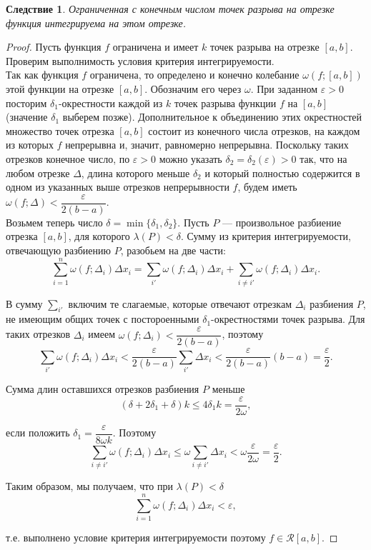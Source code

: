 \documentclass[12pt]{report}
\numberwithin{equation}{section}
\newtheorem{remark}{Следствие}[section]
\begin{document}
\begin{remark} Ограниченная с конечным числом точек разрыва на отрезке функция интегрируема на этом отрезке.
\end{remark}
\begin{proof}
Пусть функция $f$ ограничена и имеет $k$ точек разрыва на отрезке $[a,b]$. Проверим выполнимость условия критерия интегрируемости.\\

Так как функция $f$ ограничена, то определено и конечно колебание $\omega(f; [a,b])$ этой функции на отрезке $[a,b]$. Обозначим его через $\omega$. При заданном $\varepsilon > 0$ посторим $\delta_1$-окрестности каждой из $k$ точек разрыва функции $f$ на $[a,b]$ (значение $\delta_1$ выберем позже). Дополнительное к объединению этих окрестностей множество точек отрезка $[a,b]$ состоит из конечного числа отрезков, на каждом из которых $f$ непрерывна и, значит, равномерно непрерывна. Поскольку таких отрезков конечное число, по $\varepsilon > 0$ можно указать $\delta_2 = \delta_2(\varepsilon) > 0$ так, что на любом отрезке $\Delta$, длина которого меньше $\delta_2$  и который полностью содержится в одном из указанных выше отрезков непрерывности $f$, будем иметь $\omega(f; \Delta) < \dfrac{\varepsilon}{2(b-a)}$.\\

Возьмем теперь число $\delta = \min\{\delta_1, \delta_2\}$. Пусть $P$ --- произвольное разбиение отрезка $[a,b]$, для которого $\lambda(P) < \delta$. Сумму из критерия интегрируемости, отвечающую разбиению $P$, разобьем на две части:
\[ \sum_{i = 1}^n \omega(f; \Delta_i) \Delta x_i = \sum_{i'} \omega(f; \Delta_i) \Delta x_i + \sum_{i \neq i'} \omega(f; \Delta_i) \Delta x_i.\]

В сумму $\sum\limits_{i'}$ включим те слагаемые, которые отвечают отрезкам $\Delta_i$ разбиения $P$, не имеющим общих точек с постороенными $\delta_1$-окрестностями точек разрыва. Для таких отрезков $\Delta_i$ имеем $\omega(f; \Delta_i) < \dfrac{\varepsilon}{2(b-a)}$, поэтому
\[ \sum_{i'} \omega(f; \Delta_i) \Delta x_i < \frac{\varepsilon}{2(b-a)} \sum_{i'} \Delta x_i < \frac{\varepsilon}{2(b-a)} (b-a) = \frac{\varepsilon}{2}.\]

Сумма длин оставшихся отрезков разбиения $P$ меньше
\[ (\delta + 2 \delta_1 + \delta)k \leqslant 4 \delta_1 k = \frac{\varepsilon}{2\omega},\]

если положить $\delta_1 = \dfrac{\varepsilon}{8\omega k}$. Поэтому
\[ \sum_{i \neq i'} \omega(f; \Delta_i) \Delta x_i \leqslant \omega \sum_{i \neq i'} \Delta x_i < \omega \frac{\varepsilon}{2\omega} = \frac{\varepsilon}{2}.\]

Таким образом, мы получаем, что при $\lambda(P) < \delta$
\[ \sum_{i = 1}^n \omega(f; \Delta_i) \Delta x_i < \varepsilon, \]

т.е. выполнено условие критерия интегрируемости поэтому $f \in \mathcal{R}[a,b]$.
\end{proof}
\end{document}
